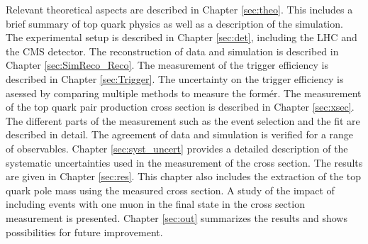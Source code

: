 Relevant theoretical aspects are described in Chapter \ref{sec:theo}. This includes a brief summary of top quark physics as well as a description of the simulation.
The experimental setup is described in Chapter \ref{sec:det}, including the LHC and the CMS detector. The reconstruction of data and simulation is described in Chapter \ref{sec:SimReco_Reco}. 
The measurement of the trigger efficiency is described in Chapter \ref{sec:Trigger}. The uncertainty on the trigger efficiency is asessed by comparing multiple methods to measure the formér.
The measurement of the top quark pair production cross section is described in Chapter \ref{sec:xsec}. The different parts of the measurement such as the event selection and the fit are described in detail.
The agreement of data and simulation is verified for a range of observables. Chapter \ref{sec:syst_uncert} provides a detailed description of the systematic uncertainties used in the measurement of the \ttbar cross section.
The results are given in Chapter \ref{sec:res}. This chapter also includes the extraction of the top quark pole mass using the measured \ttbar cross section. A study of the impact of including events with one muon in the final state in the \ttbar cross section measurement is presented. Chapter \ref{sec:out} summarizes the results and shows
possibilities for future improvement.



